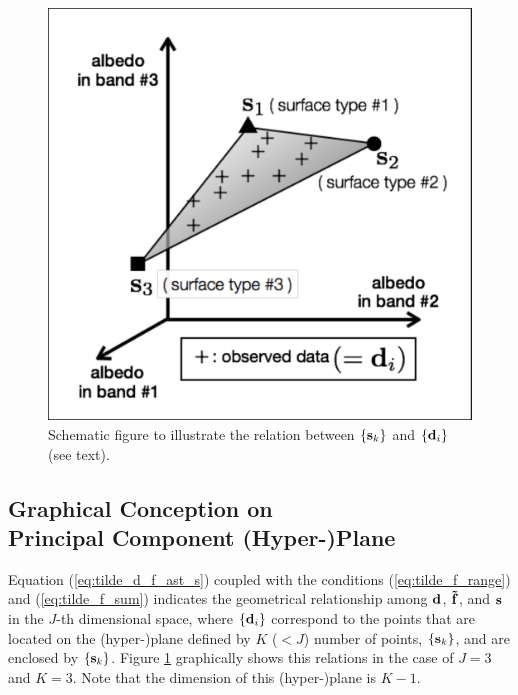 \documentclass[iop,numberedappendix,apj,]{emulateapj}
\def\fast{\tilde f}
\def\memoYF#1{\color{red}[YF: {\bf #1}]\color{black}}
\begin{document}


\begin{figure}[b!]
    \begin{center}
\includegraphics[width=\hsize]{schematics.pdf}
    \end{center}
    \caption{Schematic figure to illustrate the relation between $\{{\bf s}_k\} $ and $\{{\bf d}_i\} $ (see text). }
\label{fig:schematic}
\end{figure}


\subsection{Graphical Conception on \\Principal Component (Hyper-)Plane}
\label{ss:PCplane}


Equation (\ref{eq:tilde_d_f_ast_s}) coupled with the conditions (\ref{eq:tilde_f_range}) and (\ref{eq:tilde_f_sum}) indicates the geometrical relationship among ${\bf d}$, ${\bf \fast }$, and ${\bf s}$ in the $J$-th dimensional space, where $\{{\bf d}_i\}$ correspond to the points that are located on the (hyper-)plane defined by $K$ ($<J$) number of points, $\{{\bf s}_k\} $, and are enclosed by $\{{\bf s}_k \}$. 
Figure \ref{fig:schematic} graphically shows this relations in the case of $J=3$ and $K=3$. 
Note that the dimension of this (hyper-)plane is $K-1$.  
\end{document}
